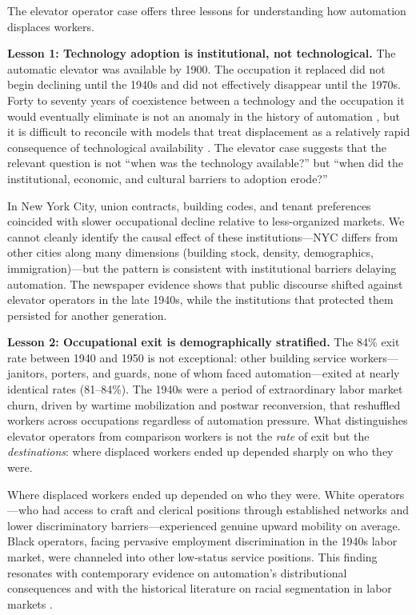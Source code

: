 \documentclass[12pt]{article}
\begin{document}
The elevator operator case offers three lessons for understanding how automation displaces workers.

\textbf{Lesson 1: Technology adoption is institutional, not technological.} The automatic elevator was available by 1900. The occupation it replaced did not begin declining until the 1940s and did not effectively disappear until the 1970s. Forty to seventy years of coexistence between a technology and the occupation it would eventually eliminate is not an anomaly in the history of automation \citep{mokyr1992}, but it is difficult to reconcile with models that treat displacement as a relatively rapid consequence of technological availability \citep{acemoglu2020}. The elevator case suggests that the relevant question is not ``when was the technology available?'' but ``when did the institutional, economic, and cultural barriers to adoption erode?''

In New York City, union contracts, building codes, and tenant preferences coincided with slower occupational decline relative to less-organized markets. We cannot cleanly identify the causal effect of these institutions---NYC differs from other cities along many dimensions (building stock, density, demographics, immigration)---but the pattern is consistent with institutional barriers delaying automation. The newspaper evidence shows that public discourse shifted against elevator operators in the late 1940s, while the institutions that protected them persisted for another generation.

\textbf{Lesson 2: Occupational exit is demographically stratified.} The 84\% exit rate between 1940 and 1950 is not exceptional: other building service workers---janitors, porters, and guards, none of whom faced automation---exited at nearly identical rates (81--84\%). The 1940s were a period of extraordinary labor market churn, driven by wartime mobilization and postwar reconversion, that reshuffled workers across occupations regardless of automation pressure. What distinguishes elevator operators from comparison workers is not the \emph{rate} of exit but the \emph{destinations}: where displaced workers ended up depended sharply on who they were.

Where displaced workers ended up depended on who they were. White operators---who had access to craft and clerical positions through established networks and lower discriminatory barriers---experienced genuine upward mobility on average. Black operators, facing pervasive employment discrimination in the 1940s labor market, were channeled into other low-status service positions. This finding resonates with contemporary evidence on automation's distributional consequences \citep{acemoglu2020, autor2024} and with the historical literature on racial segmentation in labor markets \citep{sundstrom1994}.
\end{document}
